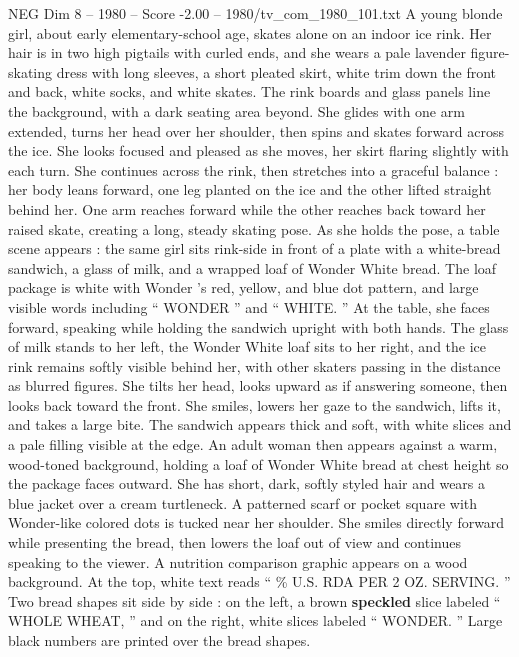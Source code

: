\begin{textsample}{NEG Dim 8 – 1980 – Score -2.00 – 1980/tv\_com\_1980\_101.txt}  \label{ex:f8_neg_054}
A young blonde girl, about early elementary-school age, skates alone on an indoor ice rink.
Her hair is in two high pigtails with curled ends, and she wears a pale lavender figure-skating dress with long sleeves, a short pleated skirt, white trim down the front and back, white socks, and white skates.
The rink boards and glass panels line the background, with a dark seating area beyond.
She glides with one arm extended, turns her head over her shoulder, then spins and skates forward across the ice.
She looks focused and pleased as she moves, her skirt flaring slightly with each turn.
She continues across the rink, then stretches into a graceful balance : her body leans forward, one leg planted on the ice and the other lifted straight behind her.
One arm reaches forward while the other reaches back toward her raised skate, creating a long, steady skating pose.
As she holds the pose, a table scene appears : the same girl sits rink-side in front of a plate with a white-bread sandwich, a glass of milk, and a wrapped loaf of Wonder White bread.
The loaf package is white with Wonder ’s red, yellow, and blue dot pattern, and large visible words including “ WONDER ” and “ WHITE. ” At the table, she faces forward, speaking while holding the sandwich upright with both hands.
The glass of milk stands to her left, the Wonder White loaf sits to her right, and the ice rink remains softly visible behind her, with other skaters passing in the distance as blurred figures.
She tilts her head, looks upward as if answering someone, then looks back toward the front.
She smiles, lowers her gaze to the sandwich, lifts it, and takes a large bite.
The sandwich appears thick and soft, with white slices and a pale filling visible at the edge.
An adult woman then appears against a warm, wood-toned background, holding a loaf of Wonder White bread at chest height so the package faces outward.
She has short, dark, softly styled hair and wears a blue jacket over a cream turtleneck.
A patterned scarf or pocket square with Wonder-like colored dots is tucked near her shoulder.
She smiles directly forward while presenting the bread, then lowers the loaf out of view and continues speaking to the viewer.
A nutrition comparison graphic appears on a wood background.
At the top, white text reads “ \% U.S.
RDA PER 2 OZ.
SERVING. ” Two bread shapes sit side by side : on the left, a brown \textbf{speckled} slice labeled “ WHOLE WHEAT, ” and on the right, white slices labeled “ WONDER. ” Large black numbers are printed over the bread shapes.

\end{textsample}
